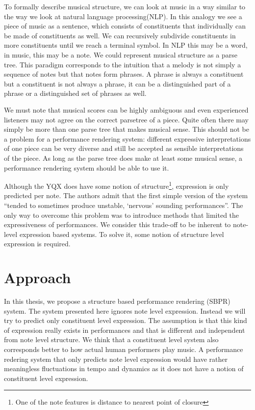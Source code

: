 \documentclass[a4paper,10pt]{article}
\begin{document}
To formally describe musical structure, we can look at music in a way similar to the way we look at natural language processing(NLP). In this analogy we see a piece of music as a sentence, which consists of constituents that individually can be made of constituents as well. We can recursively subdivide constituents in more constituents until we reach a terminal symbol. In NLP this may be a word, in music, this may be a note. We could represent musical structure as a parse tree. This paradigm corresponds to the intuition that a melody is not simply a sequence of notes but that notes form phrases. A phrase is always a constituent but a constituent is not always a phrase, it can be a distinguished part of a phrase or a distinguished set of phrases as well. 

We must note that musical scores can be highly ambiguous and even experienced listeners may not agree on the correct parsetree of a piece. Quite often there may simply be more than one parse tree that makes musical sense. This should not be a problem for a performance rendering system: different expressive interpretations of one piece can be very diverse and still be accepted as sensible interpretations of the piece. As long as the parse tree does make at least some musical sense, a performance rendering system should be able to use it.

Although the YQX does have some notion of structure\footnote{One of the note features is distance to nearest point of closure}, expression is only predicted per note. The authors admit that the first simple version of the system ``tended to sometimes produce unstable, `nervous' sounding performances''. The only way to overcome this problem was to introduce methods that limited the expressiveness of performances. We consider this trade-off to be inherent to note-level expression based systems. To solve it, some notion of structure level expression is required.


\section{Approach}
\label{sec:approach}

In this thesis, we propose a structure based performance rendering (SBPR) system. The system presented here ignores note level expression. Instead we will try to predict only constituent level expression. The assumption is that this kind of expression really exists in performances and that is different and independent from note level structure. We think that a constituent level system also corresponds better to how actual human performers play music. A performance redering system that only predicts note level expression would have rather meaningless fluctuations in tempo and dynamics as it does not have a notion of constituent level expression.
\end{document}

